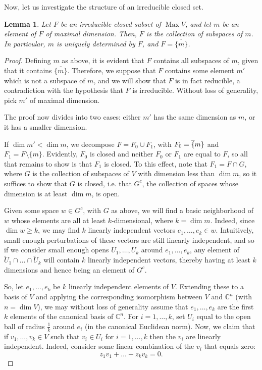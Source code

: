 \documentclass{article}
\theoremstyle{plain}
\newtheorem{lemma}{Lemma}
\theoremstyle{nonumberplain}
\newtheorem{proof}{Proof}
\DeclareMathOperator{\Max}{Max}
\newcommand{\C}{\mathbb{C}}
\begin{document}
Now, let us investigate the structure of an irreducible closed set.

\begin{lemma}\label{lemma:big}
Let $F$ be an irreducible closed subset of $\Max V$, and let $m$ be an element of $F$ of maximal dimension. Then, $F$ is the collection of subspaces of $m$. In particular, $m$ is uniquely determined by $F$, and $F = \overline{\{m\}}$.
\end{lemma}

\begin{proof}
Defining $m$ as above, it is evident that $F$ contains all subspaces of $m$, given that it contains $\overline{\{m\}}$. Therefore, we suppose that $F$ contains some element $m'$ which is not a subspace of $m$, and we will show that $F$ is in fact reducible, a contradiction with the hypothesis that $F$ is irreducible. Without loss of generality, pick $m'$ of maximal dimension.

The proof now divides into two cases: either $m'$ has the same dimension as $m$, or it has a smaller dimension.

If $\dim m' < \dim m$, we decompose $F = F_0 \cup F_1$, with $F_0 = \overline\{m\}$ and $F_1 = F \setminus \{m\}$. Evidently, $F_0$ is closed and neither $F_0$ or $F_1$ are equal to $F$, so all that remains to show is that $F_1$ is closed. To this effect, note that $F_1 = F \cap G$, where $G$ is the collection of subspaces of $V$ with dimension less than $\dim m$, so it suffices to show that $G$ is closed, i.e. that $G^c$, the collection of spaces whose dimension is at least $\dim m$, is open.

Given some space $w \in G^c$, with $G$ as above, we will find a basic neighborhood of $w$ whose elements are all at least $k$-dimensional, where $k = \dim m$. Indeed, since $\dim w \geq k$, we may find $k$ linearly independent vectors $e_1, \dots, e_k \in w$. Intuitively, small enough perturbations of these vectors are still linearly independent, and so if we consider small enough opens $U_1, \dots, U_k$ around $e_1, \dots, e_k$, any element of $\tilde U_1 \cap \dots \cap \tilde U_k$ will contain $k$ linearly independent vectors, thereby having at least $k$ dimensions and hence being an element of $G^c$.

So, let $e_1, \dots, e_k$ be $k$ linearly independent elements of $V$. Extending these to a basis of $V$ and applying the corresponding isomorphism between $V$ and $\C^n$ (with $n = \dim V$), we may without loss of generality assume that $e_1, \dots, e_k$ are the first $k$ elements of the canonical basis of $\C^n$. For $i = 1, \dots, k$, set $U_i$ equal to the open ball of radius $\frac1k$ around $e_i$ (in the canonical Euclidean norm). Now, we claim that if $v_1, \dots, v_k \in V$ such that $v_i \in U_i$ for $i = 1, \dots, k$ then the $v_i$ are linearly independent. Indeed, consider some linear combination of the $v_i$ that equals zero:
\begin{equation}
z_1 v_1 + \dots + z_k v_k = 0.
\end{equation}


\end{proof}
\end{document}

